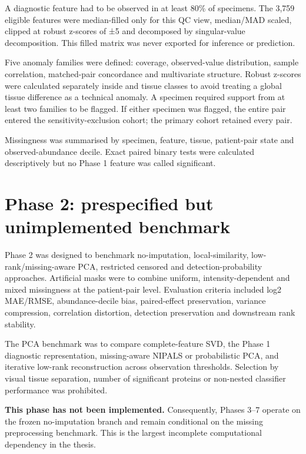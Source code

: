 A diagnostic feature had to be observed in at least 80\% of specimens. The 3,759 eligible features were median-filled only for this QC view, median/MAD scaled, clipped at robust z-scores of ±5 and decomposed by singular-value decomposition. This filled matrix was never exported for inference or prediction.

Five anomaly families were defined: coverage, observed-value distribution, sample correlation, matched-pair concordance and multivariate structure. Robust z-scores were calculated separately inside \texttt{} and \texttt{} tissue classes to avoid treating a global tissue difference as a technical anomaly. A specimen required support from at least two families to be flagged. If either specimen was flagged, the entire pair entered the sensitivity-exclusion cohort; the primary cohort retained every pair.

Missingness was summarised by specimen, feature, tissue, patient-pair state and observed-abundance decile. Exact paired binary tests were calculated descriptively but no Phase 1 feature was called significant.

\section{Phase 2: prespecified but unimplemented benchmark}
\label{sec:phase_2_prespecified_but_unimplemented_benchmark}

Phase 2 was designed to benchmark no-imputation, local-similarity, low-rank/missing-aware PCA, restricted censored and detection-probability approaches. Artificial masks were to combine uniform, intensity-dependent and mixed missingness at the patient-pair level. Evaluation criteria included log2 MAE/RMSE, abundance-decile bias, paired-effect preservation, variance compression, correlation distortion, detection preservation and downstream rank stability.

The PCA benchmark was to compare complete-feature SVD, the Phase 1 diagnostic representation, missing-aware NIPALS or probabilistic PCA, and iterative low-rank reconstruction across observation thresholds. Selection by visual tissue separation, number of significant proteins or non-nested classifier performance was prohibited.

\textbf{This phase has not been implemented.} Consequently, Phases 3–7 operate on the frozen no-imputation branch and remain conditional on the missing preprocessing benchmark. This is the largest incomplete computational dependency in the thesis.

